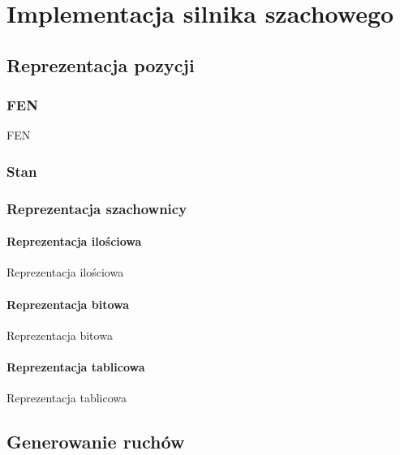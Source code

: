 
\chapter{Implementacja silnika szachowego}
\label{ch:implementacja-silnika-szachowego}





\section{Reprezentacja pozycji}
\label {sec:reprezentacja-szachownicy}

\subsection{FEN}
\label{subsec:fen}

FEN

\subsection{Stan}
\label{subsec:stan}

\subsection{Reprezentacja szachownicy}
\label{subsec:reprezentacja-szachownicy}

\subsubsection{Reprezentacja ilościowa}
\label{subsubsec:reprezentacja-ilosciowa}

Reprezentacja ilościowa

\subsubsection{Reprezentacja bitowa}
\label{subsubsec:reprezentacja-bitowa}

Reprezentacja bitowa

\subsubsection{Reprezentacja tablicowa}
\label{subsubsec:reprezentacja-tablicowa}

Reprezentacja tablicowa





\section{Generowanie ruchów}
\label{sec:generowanie-ruchow}


